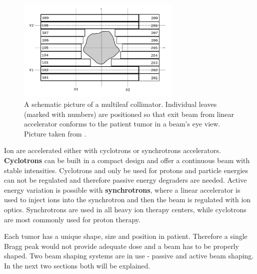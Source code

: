 \newpage

\begin{figure}[H]
\begin{center}
\includegraphics[width=0.7\textwidth]{./Fundamentals/Images/MLC.png}
\caption{A schematic picture of a multileaf collimator. Individual leaves (marked with numbers) are positioned so that exit beam from linear accelerator conforms to the patient tumor in a beam's eye view. Picture taken from \cite{MLC}.}
\label{MLC}
\end{center}
\end{figure}





Ion are accelerated either with cyclotrons or synchrotrons accelerators. \textbf{Cyclotrons} can be built in a compact design and offer a continuous beam with
stable intensities. Cyclotrons and only be used for protons and particle energies can not be regulated and therefore passive energy degraders are needed. Active energy variation is possible with \textbf{synchrotrons}, where a linear
accelerator is used to inject ions into the synchrotron and then the beam is regulated with ion optics. Synchrotrons are used in all heavy ion therapy centers, while cyclotrons are most
commonly used for proton therapy.

Each tumor has a unique shape, size and position in patient. Therefore a single Bragg peak would not provide adequate dose and a beam has to be properly shaped. Two beam shaping systems
are in use - passive and active beam shaping. In the next two sections both will be explained.


